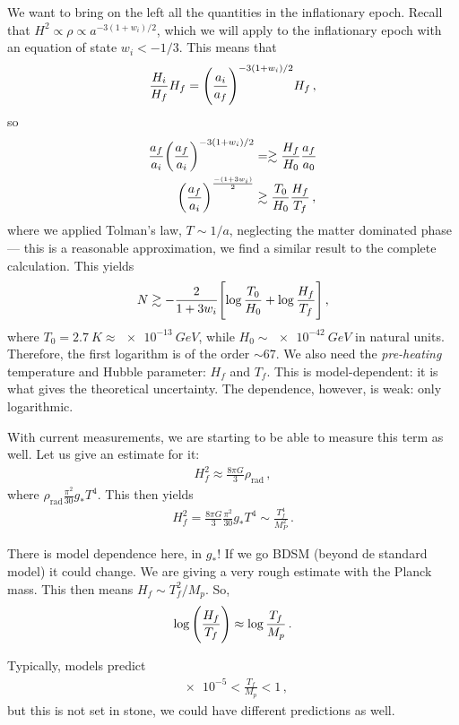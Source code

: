 \documentclass[main.tex]{subfiles}
\begin{document}
We want to bring on the left all the quantities in the inflationary epoch. 
Recall that \(H^2 \propto \rho \propto a^{-3 (1+ w_i) / 2}\), which we will apply to the inflationary epoch with an equation of state \(w_i < - 1/3\). This means that 
%
\begin{align}
\frac{H_i}{H_f} H_f = \qty(\frac{a_i}{a_f})^{-3(1+ w_i) / 2} H_f
\,,
\end{align}
%
so 
%
\begin{align}
\frac{a_f}{a_i} \qty(\frac{a_f}{a_i})^{- 3 (1+ w_i) / 2} &=\gtrsim  
\frac{H_f}{H_0} \frac{a_f}{a_0 } \\
\qty(\frac{a_f}{a_i})^{\frac{-(1 + 3 w_i)}{2}}
&\gtrsim \frac{T_0 }{H_0 } \frac{H_f}{T_f}
\,,
\end{align}
%
where we applied Tolman's law, \(T \sim 1/a\), neglecting the matter dominated phase --- this is a reasonable approximation, we find a similar result to the complete calculation. This yields 
%
\begin{align}
N \gtrsim - \frac{2}{1 + 3 w _i} \qty[ \log \frac{T_0 }{H_0 } + \log \frac{H_f}{T_f}]
\,,
\end{align}
%
where \(T_0 = \SI{2.7}{K} \approx \SI{e-13}{GeV}\), while \(H_0 \sim \SI{e-42}{GeV}\) in natural units. Therefore, the first logarithm is of the order \(\sim 67\). 
We also need the \emph{pre-heating} temperature and Hubble parameter: \(H_f\) and \(T_f\). 
This is model-dependent: it is what gives the theoretical uncertainty. 
The dependence, however, is weak: only logarithmic. 

With current measurements, we are starting to be able to measure this term as well. 
Let us give an estimate for it: 
%
\begin{align}
H_f^2 \approx \frac{8 \pi G}{3} \rho _{\text{rad}}
\,,
\end{align}
%
where \(\rho _{\text{rad}} \frac{\pi^2}{30} g_* T^{4}\). This then yields 
%
\begin{align}
H^2_f = \frac{8 \pi G}{3} \frac{\pi^2}{30} g_* T^{4} \sim \frac{T_f^4}{M_P^2}
\,.
\end{align}

There is model dependence here, in \(g_*\)! If we go BDSM (beyond de standard model) it could change. 
We are giving a very rough estimate with the Planck mass. This then means \(H_f \sim T_f^2 / M_p\). So, 
%
\begin{align}
\log \qty( \frac{H_f}{T_f}) \approx \log \frac{T_f}{M_p}
\,.
\end{align}

Typically, models predict 
%
\begin{align}
\num{e-5} < \frac{T_f}{M_p} < 1
\,,
\end{align}
%
but this is not set in stone, we could have different predictions as well. 
\end{document}
